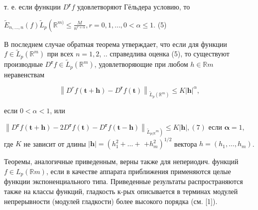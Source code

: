 \documentclass[10pt]{article}
\begin{document}
т. е. если функции $D^{\boldsymbol{r}} f$ удовлетворяют Гёльдера условию, то



$\tilde{E}_{n, \ldots, n}(f) \tilde{L}_{p}\left(\mathbb{R}^{m)} \leqslant \frac{M}{n^{r+\alpha}}, r=0,1, \ldots, 0<\alpha \leqslant 1\right.$. (5)



В последнем случае обратная теорема утверждает, что если для функции $f \in \tilde{L}_{p}\left(\mathbb{R}^{m}\right)$ при всех $n=1,2$, .. справедлива оценка (5), то существуют производные $D^{\boldsymbol{r}} f \in \tilde{L}_{p}\left(\mathbb{R}^{m}\right)$, удовлетворяющие при любом $h \in \mathbb{R} m$ неравенствам



\[

\left\|D^{r} f(\boldsymbol{t}+\boldsymbol{h})-D^{\boldsymbol{r}} f(\boldsymbol{t})\right\|_{\tilde{L}_{p}\left(\mathbb{R}^{m}\right)} \leqslant K|\boldsymbol{h}|^{\alpha},

\]



если $0<\alpha<1$, или



$\left\|D^{\boldsymbol{r}} f(\boldsymbol{t}+\boldsymbol{h})-2 D^{\boldsymbol{r}} f(\boldsymbol{t})-D^{\boldsymbol{r}} f(\boldsymbol{t}-\boldsymbol{h})\right\|_{\left.\tilde{L}_{p(\mathbb{R}}{ }^{m}\right)} \leqslant K|\boldsymbol{h}|,(7)$ если $\boldsymbol{\alpha}=1$, где $K$ не зависит от длины $|\boldsymbol{h}|=\left(h_{1}^{2}+\ldots+\right.$ $\left.+h_{m}^{2}\right)^{1 / 2}$ вектора $h=\left(h_{1}, \ldots, h_{m}\right)$.



Теоремы, аналогичные приведенным, верны также для непериодич. функций $f \in L_{p}(\mathbb{R} m)$, если в качестве аппарата приближения применяются целые функции экспоненциального типа. Приведенные результаты распространяются также на классы функций, гладкость к-рых описывается в терминах модулей непрерывности (модулей гладкости) более высокого порядка (см. [1]).
\end{document}

